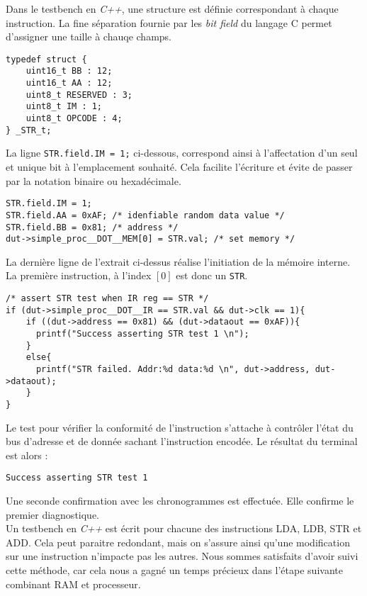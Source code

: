 Dans le testbench en \textit{C++}, une structure est définie correspondant à chaque instruction.
La fine séparation fournie par les \textit{bit field} du langage C permet d'assigner une taille à chauqe champs.
\begin{lstlisting}[style=CStyle]
typedef struct {
    uint16_t BB : 12;
    uint16_t AA : 12;
    uint8_t RESERVED : 3;
    uint8_t IM : 1;
    uint8_t OPCODE : 4;
} _STR_t;
\end{lstlisting}
La ligne \texttt{STR.field.IM = 1;} ci-dessous, correspond ainsi à l'affectation d'un seul et unique bit à l'emplacement souhaité.
Cela facilite l'écriture et évite de passer par la notation binaire ou hexadécimale.
\begin{lstlisting}[style=CStyle]
STR.field.IM = 1;
STR.field.AA = 0xAF; /* idenfiable random data value */
STR.field.BB = 0x81; /* address */
dut->simple_proc__DOT__MEM[0] = STR.val; /* set memory */
\end{lstlisting}
La dernière ligne de l'extrait ci-dessus réalise l'initiation de la mémoire interne.
La première instruction, à l'index $[0]$ est donc un \texttt{STR}.
\begin{lstlisting}[style=CStyle]
/* assert STR test when IR reg == STR */
if (dut->simple_proc__DOT__IR == STR.val && dut->clk == 1){ 
    if ((dut->address == 0x81) && (dut->dataout == 0xAF)){
      printf("Success asserting STR test 1 \n");
    }
    else{
      printf("STR failed. Addr:%d data:%d \n", dut->address, dut->dataout);
    }
}
\end{lstlisting}
Le test pour vérifier la conformité de l'instruction s'attache à contrôler l'état du bus d'adresse et de donnée sachant l'instruction encodée.
Le résultat du terminal est alors :
\begin{lstlisting}[frame=single, basicstyle = \ttfamily \footnotesize]
    Success asserting STR test 1
\end{lstlisting}
Une seconde confirmation avec les chronogrammes est effectuée.
Elle confirme le premier diagnostique.\\

Un testbench en \textit{C++} est écrit pour chacune des instructions LDA, LDB, STR et ADD.
Cela peut paraitre redondant, mais on s'assure ainsi qu'une modification sur une instruction n'impacte pas les autres.
Nous sommes satisfaits d'avoir suivi cette méthode, car cela nous a gagné un temps précieux dans l'étape suivante combinant RAM et processeur.


